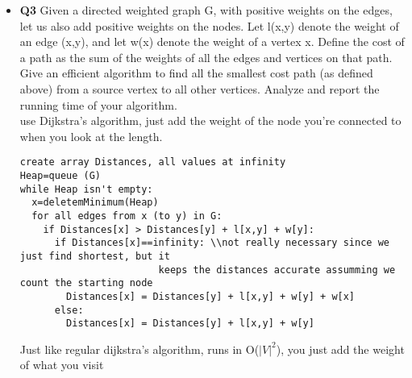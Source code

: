 \documentclass[11pt]{article}
\begin{document}
\begin{itemize}
\item \textbf{Q3} 
Given a directed weighted graph G, with positive weights on the edges, let us also add positive weights on the nodes. Let l(x,y) denote the weight of an edge (x,y), and let w(x) denote the weight of a vertex x. Define the cost of a path as the sum of the weights of all the edges and vertices on that path. Give an efficient algorithm to find all the smallest cost path (as defined above) from a source vertex to all other vertices. Analyze and report the running time of your algorithm.
\\use Dijkstra's algorithm, just add the weight of the node you're connected to when you look at the length.
\begin{verbatim}
create array Distances, all values at infinity
Heap=queue (G)
while Heap isn't empty:
  x=deletemMinimum(Heap)
  for all edges from x (to y) in G:
    if Distances[x] > Distances[y] + l[x,y] + w[y]:
      if Distances[x]==infinity: \\not really necessary since we just find shortest, but it 
                        keeps the distances accurate assumming we count the starting node
        Distances[x] = Distances[y] + l[x,y] + w[y] + w[x] 
      else:
        Distances[x] = Distances[y] + l[x,y] + w[y]
\end{verbatim}
Just like regular dijkstra's algorithm, runs in O($|V|^2$), you just add the weight of what you visit


\end{itemize}
\end{document}
